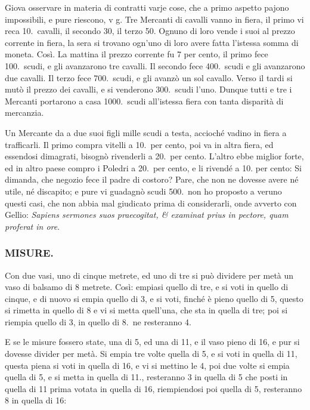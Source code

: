 \documentclass[11pt,a6paper]{article}
\begin{document}
Giova osservare in materia di contratti varje
cose, che a primo aspetto pajono impossibili, e
pure riescono, v g. Tre Mercanti di cavalli vanno in
fiera, il primo vi reca 10.\ cavalli, il secondo 30, il
terzo 50. Ognuno di loro vende i suoi al prezzo
corrente in fiera, la sera si trovano ogn'uno di loro
avere fatta l'istessa somma di moneta. Così. La mattina
il prezzo corrente fu 7 per cento, il primo fece
100.\ scudi, e gli avanzarono tre cavalli. Il secondo
fece 400.\ scudi e gli avanzarono due cavalli. Il terzo
fece 700.\ scudi, e gli avanzò un sol cavallo. Verso
il tardi si mutò il prezzo dei cavalli, e si venderono
300.\ scudi l'uno. Dunque tutti e tre i Mercanti
portarono a casa 1000.\ scudi all'istessa fiera con tanta
disparità di mercanzia.

Un Mercante da a due suoi figli mille scudi a
testa, accioché vadino in fiera a trafficarli. Il primo
compra vitelli a 10.\ per cento, poi va in altra fiera,
ed essendosi dimagrati, bisognò rivenderli a 20.\ per
cento. L'altro ebbe miglior forte, ed in altro paese
compro i Poledri a 20.\ per cento, e li rivendé a 10.
per cento: Si dimanda, che negozio fece il padre di
costoro? Pare, che non ne dovesse avere né utile,
né discapito; e pure vi guadagnò scudi 500.\ non ho
proposto a veruno questi casi, che non abbia mal
giudicato prima di considerarli, onde avverto con
Gellio: \textit{Sapiens sermones suos praecogitat,
 \& examinat prius in pectore, quam proferat in ore}.

\subsubsection{MISURE.}

Con due vasi, uno di cinque metrete, ed uno di
tre si può dividere per metà un vaso di balsamo
di 8 metrete. Così: empiasi quello di tre, e si voti in
quello di cinque, e di nuovo si empia quello di 3, e
si voti, finché è pieno quello di 5, questo si rimetta
in quello di 8 e vi si metta quell'una, che sta in
quella di tre; poi si riempia quello di 3, in quello
di 8.\ ne resteranno 4.

E se le misure fossero state, una di 5, ed una
di 11, e il vaso pieno di 16, e pur si dovesse divider
per metà. Si empia tre volte quella di 5, e si voti in
quella di 11, questa piena si voti in quella di 16, e vi
si mettino le 4, poi due volte si empia quella di 5,
e si metta in quella di 11., resteranno 3 in quella
di 5 che posti in quella di 11 prima votata in quella
di 16, riempiendosi poi quella di 5, resteranno 8 in
quella di 16:
\end{document}
